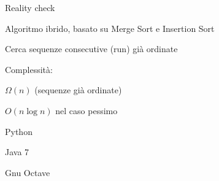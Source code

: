 \begin{frame}{Reality check}

\vspace{-9pt}
\begin{myboxtitle}
\BI
\item Algoritmo ibrido, basato su Merge Sort e Insertion Sort
\item Cerca sequenze consecutive (run) già ordinate 
\item Complessità: 
\BI
\item $\Omega(n)$ (sequenze già ordinate)
\item $O(n \log n)$ nel caso pessimo
\EI
\EI
\end{myboxtitle}

\begin{myboxtitle}[Utilizzazione]
\BI
\item Python
\item Java 7
\item Gnu Octave
\EI
\end{myboxtitle}

\end{frame}%



